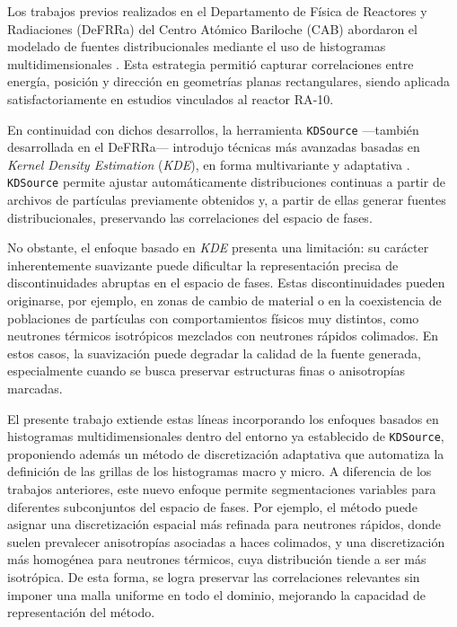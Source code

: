 Los trabajos previos realizados en el Departamento de Física de Reactores y Radiaciones (DeFRRa) del Centro Atómico Bariloche (CAB) abordaron el modelado de fuentes distribucionales mediante el uso de histogramas multidimensionales \cite{Fairhurst2017Hist, Ayala2019Hist, Abbate2020Hist}. Esta estrategia permitió capturar correlaciones entre energía, posición y dirección en geometrías planas rectangulares, siendo aplicada satisfactoriamente en estudios vinculados al reactor RA‑10.

En continuidad con dichos desarrollos, la herramienta \texttt{KDSource} —también desarrollada en el DeFRRa— introdujo técnicas más avanzadas basadas en \textit{Kernel Density Estimation} (\textit{KDE}), en forma multivariante y adaptativa \cite{Abbate2021KDSource, Schmidt2022KDSourcePaper, Fox2022KDE, Gimenez2024KDSourceOpenMC}. \texttt{KDSource} permite ajustar automáticamente distribuciones continuas a partir de archivos de partículas previamente obtenidos y, a partir de ellas generar fuentes distribucionales, preservando las correlaciones del espacio de fases.

No obstante, el enfoque basado en \textit{KDE} presenta una limitación: su carácter inherentemente suavizante puede dificultar la representación precisa de discontinuidades abruptas en el espacio de fases. Estas discontinuidades pueden originarse, por ejemplo, en zonas de cambio de material o en la coexistencia de poblaciones de partículas con comportamientos físicos muy distintos, como neutrones térmicos isotrópicos mezclados con neutrones rápidos colimados. En estos casos, la suavización puede degradar la calidad de la fuente generada, especialmente cuando se busca preservar estructuras finas o anisotropías marcadas.

El presente trabajo extiende estas líneas incorporando los enfoques basados en histogramas multidimensionales dentro del entorno ya establecido de \texttt{KDSource}, proponiendo además un método de discretización adaptativa que automatiza la definición de las grillas de los histogramas macro y micro. A diferencia de los trabajos anteriores, este nuevo enfoque permite segmentaciones variables para diferentes subconjuntos del espacio de fases. Por ejemplo, el método puede asignar una discretización espacial más refinada para neutrones rápidos, donde suelen prevalecer anisotropías asociadas a haces colimados, y una discretización más homogénea para neutrones térmicos, cuya distribución tiende a ser más isotrópica. De esta forma, se logra preservar las correlaciones relevantes sin imponer una malla uniforme en todo el dominio, mejorando la capacidad de representación del método.

